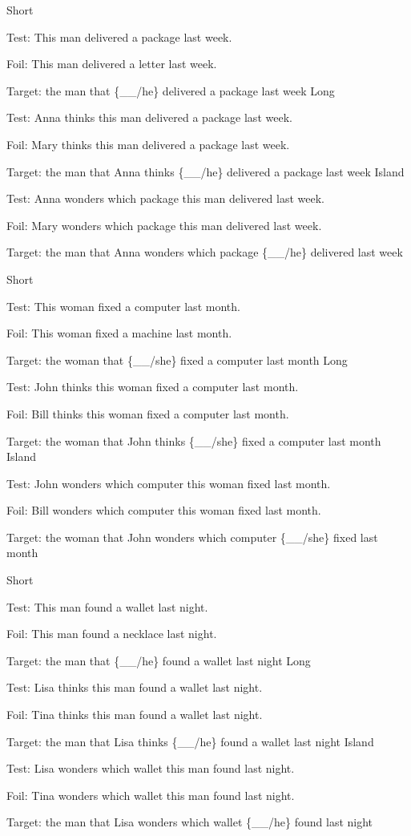 \pex %
\a Short\par\nobreak
Test: This man delivered a package last week.\par\nobreak
Foil: This man delivered a letter last week.\par\nobreak
Target: the man that \{\_\_/he\} delivered a package last week
\a Long\par\nobreak
Test: Anna thinks this man delivered a package last week.\par\nobreak
Foil: Mary thinks this man delivered a package last week.\par\nobreak
Target: the man that Anna thinks \{\_\_/he\} delivered a package last week
\a Island\par\nobreak
Test: Anna wonders which package this man delivered last week.\par\nobreak
Foil: Mary wonders which package this man delivered last week.\par\nobreak
Target: the man that Anna wonders which package \{\_\_/he\} delivered last week
\xe

\pex %
\a Short\par\nobreak
Test: This woman fixed a computer last month.\par\nobreak
Foil: This woman fixed a machine last month.\par\nobreak
Target: the woman that \{\_\_/she\} fixed a computer last month
\a Long\par\nobreak
Test: John thinks this woman fixed a computer last month.\par\nobreak
Foil: Bill thinks this woman fixed a computer last month.\par\nobreak
Target: the woman that John thinks \{\_\_/she\} fixed a computer last month
\a Island\par\nobreak
Test: John wonders which computer this woman fixed last month.\par\nobreak
Foil: Bill wonders which computer this woman fixed last month.\par\nobreak
Target: the woman that John wonders which computer \{\_\_/she\} fixed last month
\xe

\pex %
\a Short\par\nobreak
Test: This man found a wallet last night.\par\nobreak
Foil: This man found a necklace last night.\par\nobreak
Target: the man that \{\_\_/he\} found a wallet last night
\a Long\par\nobreak
Test: Lisa thinks this man found a wallet last night.\par\nobreak
Foil: Tina thinks this man found a wallet last night.\par\nobreak
Target: the man that Lisa thinks \{\_\_/he\} found a wallet last night
\a Island\par\nobreak
Test: Lisa wonders which wallet this man found last night.\par\nobreak
Foil: Tina wonders which wallet this man found last night.\par\nobreak
Target: the man that Lisa wonders which wallet \{\_\_/he\} found last night
\xe

